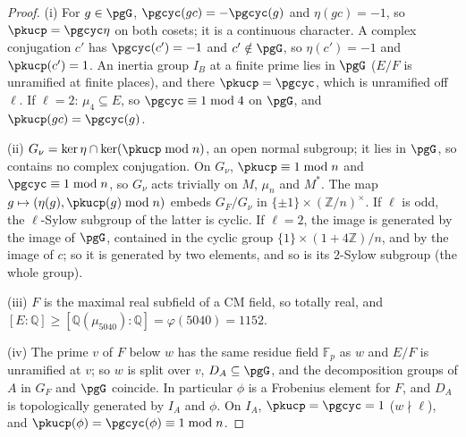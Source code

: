 \documentclass[10pt]{amsart}
\theoremstyle{definition}
\theoremstyle{remark}
\newcommand{\Z}{\mathbb Z}
\newcommand{\Q}{\mathbb Q}
\begin{document}
\begin{proof}
(i) For $g\in\pgG$, $\pgcyc(gc)=-\pgcyc(g)$ and $\eta(gc)=-1$, so $\pkucp=\pgcyc\eta$ on both cosets;
it is a continuous character. A complex conjugation $c'$ has $\pgcyc(c')=-1$ and $c'\notin\pgG$,
so $\eta(c')=-1$ and $\pkucp(c')=1$. An inertia group $I_B$ at a finite prime lies in $\pgG$ ($E/F$
is unramified at finite places), and there $\pkucp=\pgcyc$, which is unramified off $\ell$. If
$\ell=2$: $\mu_4\subseteq E$, so $\pgcyc\equiv1\bmod4$ on $\pgG$, and $\pkucp(gc)=\pgcyc(g)$.

(ii) $G_\nu=\ker\eta\cap\ker(\pkucp\bmod n)$, an open normal subgroup; it lies in $\pgG$, so contains
no complex conjugation. On $G_\nu$, $\pkucp\equiv1\bmod n$ and $\pgcyc\equiv1\bmod n$, so $G_\nu$
acts trivially on $M$, $\mu_n$ and $M^*$. The map $g\mapsto(\eta(g),\pkucp(g)\bmod n)$ embeds
$G_F/G_\nu$ in $\{\pm1\}\times(\Z/n)^\times$. If $\ell$ is odd, the $\ell$-Sylow subgroup of the
latter is cyclic. If $\ell=2$, the image is generated by the image of $\pgG$, contained in the
cyclic group $\{1\}\times(1+4\Z)/n$, and by the image of $c$; so it is generated by two elements,
and so is its $2$-Sylow subgroup (the whole group).

(iii) $F$ is the maximal real subfield of a CM field, so totally real, and $[E:\Q]\ge[\Q(\mu_{5040})
:\Q]=\varphi(5040)=1152$.

(iv) The prime $v$ of $F$ below $w$ has the same residue field $\mathbb F_p$ as $w$ and $E/F$ is
unramified at $v$; so $w$ is split over $v$, $D_A\subseteq\pgG$, and the decomposition groups of $A$
in $G_F$ and $\pgG$ coincide. In particular $\phi$ is a Frobenius element for $F$, and $D_A$ is
topologically generated by $I_A$ and $\phi$. On $I_A$, $\pkucp=\pgcyc=1$ ($w\nmid\ell$), and
$\pkucp(\phi)=\pgcyc(\phi)\equiv1\bmod n$.
\end{proof}
\end{document}
